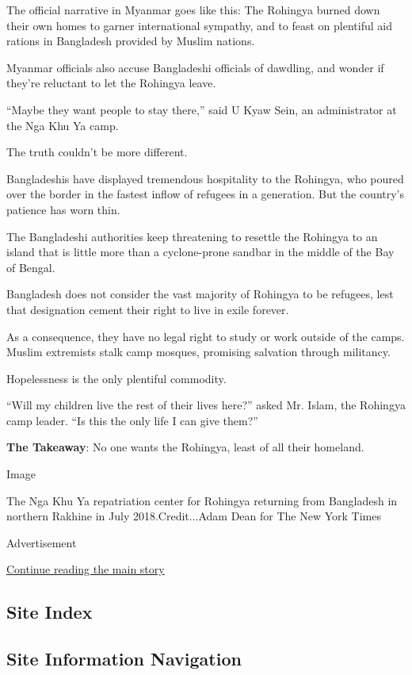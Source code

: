 The official narrative in Myanmar goes like this: The Rohingya burned
down their own homes to garner international sympathy, and to feast on
plentiful aid rations in Bangladesh provided by Muslim nations.

Myanmar officials also accuse Bangladeshi officials of dawdling, and
wonder if they're reluctant to let the Rohingya leave.

``Maybe they want people to stay there,'' said U Kyaw Sein, an
administrator at the Nga Khu Ya camp.

The truth couldn't be more different.

Bangladeshis have displayed tremendous hospitality to the Rohingya, who
poured over the border in the fastest inflow of refugees in a
generation. But the country's patience has worn thin.

The Bangladeshi authorities keep threatening to resettle the Rohingya to
an island that is little more than a cyclone-prone sandbar in the middle
of the Bay of Bengal.

Bangladesh does not consider the vast majority of Rohingya to be
refugees, lest that designation cement their right to live in exile
forever.

As a consequence, they have no legal right to study or work outside of
the camps. Muslim extremists stalk camp mosques, promising salvation
through militancy.

Hopelessness is the only plentiful commodity.

``Will my children live the rest of their lives here?'' asked Mr. Islam,
the Rohingya camp leader. ``Is this the only life I can give them?''

\textbf{The Takeaway}: No one wants the Rohingya, least of all their
homeland.

Image

The Nga Khu Ya repatriation center for Rohingya returning from
Bangladesh in northern Rakhine in July 2018.Credit...Adam Dean for The
New York Times

Advertisement

\protect\hyperlink{after-bottom}{Continue reading the main story}

\hypertarget{site-index}{%
\subsection{Site Index}\label{site-index}}

\hypertarget{site-information-navigation}{%
\subsection{Site Information
Navigation}\label{site-information-navigation}}

